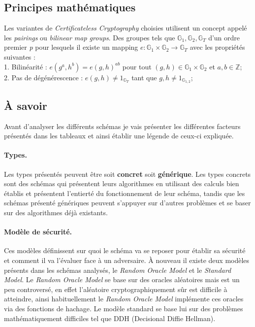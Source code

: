 \subsection{Principes mathématiques}
Les variantes de \textit{Certificateless Cryptography} choisies utilisent un concept appelé les \textit{pairings} ou \textit{bilinear map groups}.
Des groupes tels que $\mathbb{G}_1, \mathbb{G}_2, \mathbb{G}_T$ d'un ordre premier \textit{p} pour lesquels il existe un mapping $e : \mathbb{G}_1 \times \mathbb{G}_2 \rightarrow \mathbb{G}_T$ avec les propriétés suivantes :\\
1. Bilinéarité : $e(g^a, h^b) = e(g, h)^{ab}$ pour tout $(g,h) \in \mathbb{G}_1 \times \mathbb{G}_2$ et $a,b \in \mathbb{Z}$;\\
2. Pas de dégénérescence : $e(g,h) \neq 1_{\mathbb{G}_T} $ tant que $g,h \neq 1_{\mathbb{G}_{1,2}}$;
\subsection{À savoir}
\label{subsec:asavoir}
Avant d'analyser les différents schémas je vais présenter les différentes facteurs présentés dans les tableaux et ainsi établir une légende de ceux-ci expliquée.
\paragraph*{Types.}Les types présentés peuvent être soit \textbf{concret} soit \textbf{générique}. Les types concrets sont des schémas qui présentent leurs algorithmes en utilisant des calculs bien établis et présentent l'entierté du fonctionnement de leur schéma, tandis que les schémas présenté génériques peuvent s'appuyer sur d'autres problèmes et se baser sur des algorithmes déjà existants.\\
\paragraph*{Modèle de sécurité.} Ces modèles définissent sur quoi le schéma va se reposer pour établir sa sécurité et comment il va l'évaluer face à un adversaire. À nouveau il existe deux modèles présents dans les schémas analysés, le \textit{Random Oracle Model} et le \textit{Standard Model}. Le \textit{Random Oracle Model} se base sur des oracles aléatoires mais est un peu controversé, en effet l'aléatoire cryptographiquement sûr est difficile à atteindre, ainsi habituellement le \textit{Random Oracle Model} implémente ces oracles via des fonctions de hachage. Le modèle standard se base lui sur des problèmes mathématiquement difficiles tel que DDH (Decisional Diffie Hellman). \\
